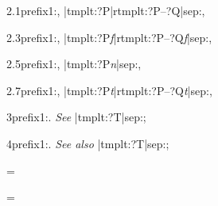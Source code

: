 
              {{2.1}{prefix1:, |tmplt:?P|rtmplt:?P--?Q|sep:, }{}}

              {{2.3}{prefix1:, |tmplt:?P\emph{f}|rtmplt:?P--?Q\emph{f}|sep:, }{}}

              {{2.5}{prefix1:, |tmplt:?P\emph{n}|sep:, }{}}

              {{2.7}{prefix1:, |tmplt:?P\emph{t}|rtmplt:?P--?Q\emph{t}|sep:, }{}}

              {{3}{prefix1:. \emph{See} |tmplt:?T|sep:; }{}}

              {{4}{prefix1:. \emph{See also} |tmplt:?T|sep:; }{}}



\def \zixnamelist {}
\setflag \zindexing = \false


\def \generateindex #1{%
  \append{#1}{\zixnamelist}%
  \global\setflag \zindexing = \true}


\setflag \zixdivopen = \false


\def \zindexinit {%
  \if \zindexing
    \maplist{\zixwritezzp{##1}}{\zixnamelist}%
    \immediate\openout \zixrootfile = \jobname.zzi\relax
    \immediate\write \zixrootfile 
      {\zcomment Raw index entry file for book `\jobname' root.}%
  \fi}

\def \zindexfinal {%
  \if \zindexing
    \immediate\write \zixrootfile {\zcomment [end]}%
    \immediate\closeout \zixrootfile
  \fi}

\def \zindexdivinit #1{%
  \if \zindexing
    \immediate\openout \zixdivfile = #1.zzi\relax
    \immediate\write \zixdivfile
      {\zcomment Raw index entry file for book `\jobname', division `#1'.}%
    \global\setflag \zixdivopen = \true
  \fi}

\def \zindexdivfinal {%
  \if \zixdivopen
    \immediate\write \zixdivfile {\zcomment [end]}%
    \immediate\closeout \zixdivfile
    \global\setflag \zixdivopen = \false
  \fi}

